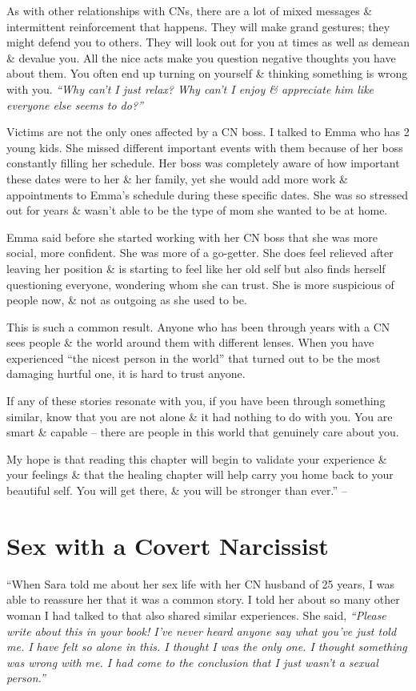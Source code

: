 \documentclass{article}
\numberwithin{equation}{section}
\begin{document}
As with other relationships with CNs, there are a lot of mixed messages \& intermittent reinforcement that happens. They will make grand gestures; they might defend you to others. They will look out for you at times as well as demean \& devalue you. All the nice acts make you question negative thoughts you have about them. You often end up turning on yourself \& thinking something is wrong with you. \textit{``Why can't I just relax? Why can't I enjoy \& appreciate him like everyone else seems to do?''}

Victims are not the only ones affected by a CN boss. I talked to Emma who has 2 young kids. She missed different important events with them because of her boss constantly filling her schedule. Her boss was completely aware of how important these dates were to her \& her family, yet she would add more work \& appointments to Emma's schedule during these specific dates. She was so stressed out for years \& wasn't able to be the type of mom she wanted to be at home.

Emma said before she started working with her CN boss that she was more social, more confident. She was more of a go-getter. She does feel relieved after leaving her position \& is starting to feel like her old self but also finds herself questioning everyone, wondering whom she can trust. She is more suspicious of people now, \& not as outgoing as she used to be.

This is such a common result. Anyone who has been through years with a CN sees people \& the world around them with different lenses. When you have experienced ``the nicest person in the world'' that turned out to be the most damaging hurtful one, it is hard to trust anyone.

If any of these stories resonate with you, if you have been through something similar, know that you are not alone \& it had nothing to do with you. You are smart \& capable -- there are people in this world that genuinely care about you.

My hope is that reading this chapter will begin to validate your experience \& your feelings \& that the healing chapter will help carry you home back to your beautiful self. You will get there, \& you will be stronger than ever.'' -- \cite[pp. 100--104]{Mirza2017}


\section{Sex with a Covert Narcissist}
``When Sara told me about her sex life with her CN husband of 25 years, I was able to reassure her that it was a common story. I told her about so many other woman I had talked to that also shared similar experiences. She said, \textit{``Please write about this in your book! I've never heard anyone say what you've just told me. I have felt so alone in this. I thought I was the only one. I thought something was wrong with me. I had come to the conclusion that I just wasn't a sexual person.''}
\end{document}
